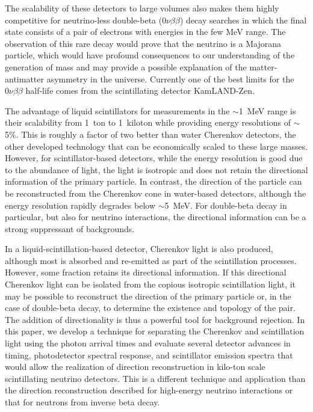 \documentclass[aps,prc,twocolumn,groupedaddress,showpacs,amsmath,amssymb,floatfix,superscriptaddress]{revtex4}
\begin{document}
The scalability of these detectors to large volumes also makes them
highly competitive for neutrino-less double-beta ($0\nu\beta\beta$)
decay searches in which the final state consists of a pair of
electrons with energies in the few MeV range.  The observation of this
rare decay would prove that the neutrino is a Majorana particle, which
would have profound consequences to our understanding of the generation of
mass and may provide a possible explanation of the matter-antimatter
asymmetry in the universe.  Currently one of the best limits for the
$0\nu\beta\beta$ half-life comes from the scintillating detector
KamLAND-Zen\cite{KZ0nu}.

The advantage of liquid scintillators for measurements in the
$\sim$1~MeV range is their scalability from 1~ton to 1~kiloton while
providing energy resolutions of $\sim$5\%. This is roughly a factor of
two better than water Cherenkov detectors, the other developed
technology that can be economically scaled to these large
masses. However, for scintillator-based detectors, while the energy
resolution is good due to the abundance of light, the light is
isotropic and does not retain the directional information of the
primary particle.  In contrast, the direction of the particle can be
reconstructed from the Cherenkov cone in water-based detectors,
although the energy resolution rapidly degrades below $\sim$5~MeV. For
double-beta decay in particular, but also for neutrino interactions,
the directional information can be a strong suppressant of
backgrounds.

In a liquid-scintillation-based detector, Cherenkov light is also
produced, although most is absorbed and re-emitted as part of the
scintillation processes.  However, some fraction retains its
directional information. If this directional Cherenkov light can be
isolated from the copious isotropic scintillation light, it may be
possible to reconstruct the direction of the primary particle or, in
the case of double-beta decay, to determine the existence and topology
of the pair.  The addition of directionality is thus a powerful tool
for background rejection.  In this paper, we develop a technique for
separating the Cherenkov and scintillation light using the photon arrival
times and evaluate several detector advances in timing, photodetector 
spectral response, and scintillator emission spectra that would allow
the realization of direction reconstruction in kilo-ton scale
scintillating neutrino detectors. This is a different technique and application than the direction reconstruction described for high-energy neutrino interactions\cite{john} or that for neutrons from inverse beta decay\cite{chooz,dcDirection}. 
\end{document}
